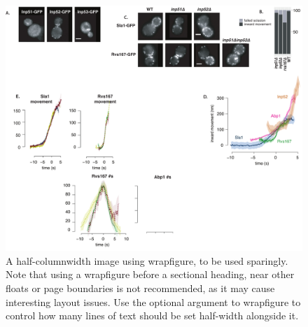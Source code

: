 \documentclass[9pt,lineno]{elife}
\begin{document}
\begin{figure}[h]
	\includegraphics[width=\hsize]{figures/inp4}
	\caption{A half-columnwidth image using wrapfigure, to be used sparingly. Note that using a wrapfigure before a sectional heading, near other floats or page boundaries is not recommended, as it may cause interesting layout issues. Use the optional argument to wrapfigure to control how many lines of text should be set half-width alongside it.}
	\label{fig:halfwidth}
\end{figure}
\end{document}
